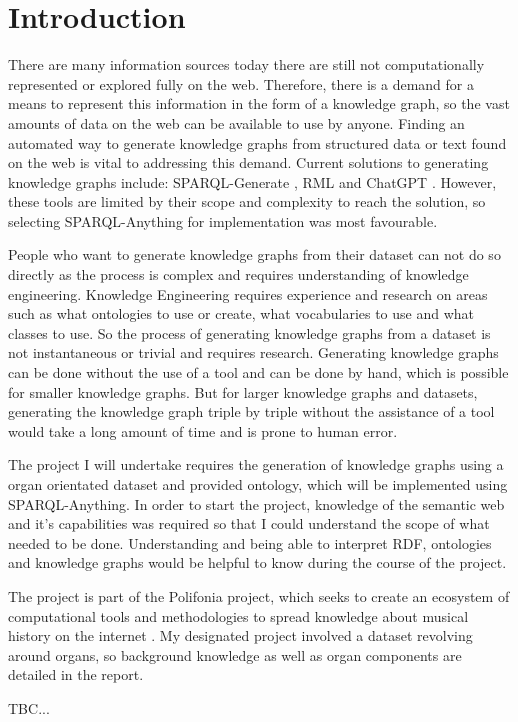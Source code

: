\chapter{Introduction}
There are many information sources today there are still not computationally represented or explored fully on the web. Therefore, there is a demand for a means to represent this information in the form of a knowledge graph, so the vast amounts of data on the web can be available to use by anyone. Finding an automated way to generate knowledge graphs from structured data or text found on the web is vital to addressing this demand. Current solutions to generating knowledge graphs include: SPARQL-Generate \cite{sparqlgenerate}, RML \cite{rml} and ChatGPT \cite{chatgptwebsite}. However, these tools are limited by their scope and complexity to reach the solution, so selecting SPARQL-Anything \cite{sparqlanythinggithub} for implementation was most favourable. 

People who want to generate knowledge graphs from their dataset can not do so directly as the process is complex and requires understanding of knowledge engineering. Knowledge Engineering requires experience and research on areas such as what ontologies to use or create, what vocabularies to use and what classes to use. So the process of generating knowledge graphs from a dataset is not instantaneous or trivial and requires research. Generating knowledge graphs can be done without the use of a tool and can be done by hand, which is possible for smaller knowledge graphs. But for larger knowledge graphs and datasets, generating the knowledge graph triple by triple without the assistance of a tool would take a long amount of time and is prone to human error.

The project I will undertake requires the generation of knowledge graphs using a organ orientated dataset and provided ontology, which will be implemented using SPARQL-Anything. In order to start the project, knowledge of the semantic web and it's capabilities was required so that I could understand the scope of what needed to be done. Understanding and being able to interpret RDF, ontologies and knowledge graphs would be helpful to know during the course of the project. 

The project is part of the Polifonia project, which seeks to create an ecosystem of computational tools and methodologies to spread knowledge about musical history on the internet \cite{polifoniaproject}. My designated project involved a dataset revolving around organs, so background knowledge as well as organ components are detailed in the report. 


TBC...
